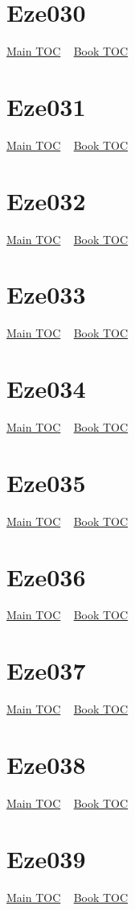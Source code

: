 \documentclass{book}
\begin{document}
  \section{Eze030}\hyperlink{toc}{Main TOC} ~ \hyperref[subsec:Eze]{Book TOC} 
  \section{Eze031}\hyperlink{toc}{Main TOC} ~ \hyperref[subsec:Eze]{Book TOC} 
  \section{Eze032}\hyperlink{toc}{Main TOC} ~ \hyperref[subsec:Eze]{Book TOC} 
  \section{Eze033}\hyperlink{toc}{Main TOC} ~ \hyperref[subsec:Eze]{Book TOC} 
  \section{Eze034}\hyperlink{toc}{Main TOC} ~ \hyperref[subsec:Eze]{Book TOC} 
  \section{Eze035}\hyperlink{toc}{Main TOC} ~ \hyperref[subsec:Eze]{Book TOC} 
  \section{Eze036}\hyperlink{toc}{Main TOC} ~ \hyperref[subsec:Eze]{Book TOC} 
  \section{Eze037}\hyperlink{toc}{Main TOC} ~ \hyperref[subsec:Eze]{Book TOC} 
  \section{Eze038}\hyperlink{toc}{Main TOC} ~ \hyperref[subsec:Eze]{Book TOC} 
  \section{Eze039}\hyperlink{toc}{Main TOC} ~ \hyperref[subsec:Eze]{Book TOC} 
\end{document}

